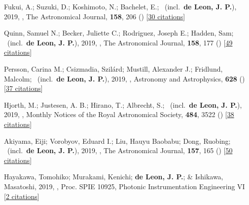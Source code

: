 \item[{\color{numcolor}\scriptsize16}] Fukui, A.; Suzuki, D.; Koshimoto, N.; Bachelet, E.; \etal\ (incl.\ \textbf{de Leon, J. P.}), 2019, , The Astronomical Journal, \textbf{158}, 206 () [\href{https://ui.adsabs.harvard.edu/abs/2019AJ....158..206F}{30 citations}]

\item[{\color{numcolor}\scriptsize15}] Quinn, Samuel N.; Becker, Juliette C.; Rodriguez, Joseph E.; Hadden, Sam; \etal\ (incl.\ \textbf{de Leon, J. P.}), 2019, , The Astronomical Journal, \textbf{158}, 177 () [\href{https://ui.adsabs.harvard.edu/abs/2019AJ....158..177Q}{49 citations}]

\item[{\color{numcolor}\scriptsize14}] Persson, Carina M.; Csizmadia, Szil{\'a}rd; Mustill, Alexander J.; Fridlund, Malcolm; \etal\ (incl.\ \textbf{de Leon, J. P.}), 2019, , Astronomy and Astrophysics, \textbf{628} () [\href{https://ui.adsabs.harvard.edu/abs/2019A&A...628A..64P}{37 citations}]

\item[{\color{numcolor}\scriptsize13}] Hjorth, M.; Justesen, A. B.; Hirano, T.; Albrecht, S.; \etal\ (incl.\ \textbf{de Leon, J. P.}), 2019, , Monthly Notices of the Royal Astronomical Society, \textbf{484}, 3522 () [\href{https://ui.adsabs.harvard.edu/abs/2019MNRAS.484.3522H}{38 citations}]

\item[{\color{numcolor}\scriptsize12}] Akiyama, Eiji; Vorobyov, Eduard I.; Liu, Hauyu Baobabu; Dong, Ruobing; \etal\ (incl.\ \textbf{de Leon, J. P.}), 2019, , The Astronomical Journal, \textbf{157}, 165 () [\href{https://ui.adsabs.harvard.edu/abs/2019AJ....157..165A}{50 citations}]

\item[{\color{numcolor}\scriptsize11}] Hayakawa, Tomohiko; Murakami, Kenichi; \textbf{de Leon, J. P.}; \& Ishikawa, Masatoshi, 2019, , Proc. SPIE 10925, Photonic Instrumentation Engineering VI [\href{https://www.spiedigitallibrary.org/conference-proceedings-of-spie/10925/1092507/Focus-adjustable-motion-blur-compensation-method-using-deformable-mirror/10.1117/12.2509567.short}{2 citations}]

